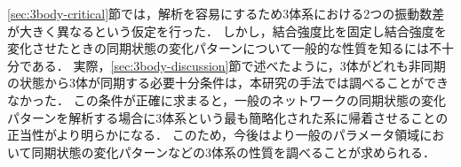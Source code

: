 \documentclass[../main]{subfiles}
\begin{document}
\ref{sec:3body-critical}節では，解析を容易にするため3体系における2つの振動数差が大きく異なるという仮定を行った．
しかし，結合強度比を固定し結合強度を変化させたときの同期状態の変化パターンについて一般的な性質を知るには不十分である．
実際，\ref{sec:3body-discussion}節で述べたように，3体がどれも非同期の状態から3体が同期する必要十分条件は，本研究の手法では調べることができなかった．
この条件が正確に求まると，一般のネットワークの同期状態の変化パターンを解析する場合に3体系という最も簡略化された系に帰着させることの正当性がより明らかになる．
このため，今後はより一般のパラメータ領域において同期状態の変化パターンなどの3体系の性質を調べることが求められる．
\end{document}
